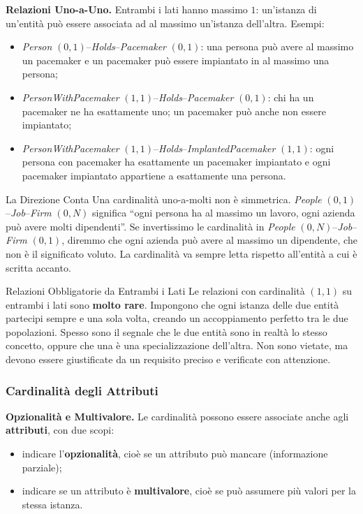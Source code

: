 \documentclass[12pt]{extarticle}
\begin{document}
\medskip
\noindent \textbf{Relazioni Uno-a-Uno.} Entrambi i lati hanno massimo $1$: un'istanza di un'entità può essere associata ad al massimo un'istanza dell'altra. Esempi:
\begin{itemize}
    \item \textit{Person} $(0,1)$--\textit{Holds}--\textit{Pacemaker} $(0,1)$: una persona può avere al massimo un pacemaker e un pacemaker può essere impiantato in al massimo una persona;
    \item \textit{PersonWithPacemaker} $(1,1)$--\textit{Holds}--\textit{Pacemaker} $(0,1)$: chi ha un pacemaker ne ha esattamente uno; un pacemaker può anche non essere impiantato;
    \item \textit{PersonWithPacemaker} $(1,1)$--\textit{Holds}--\textit{ImplantedPacemaker} $(1,1)$: ogni persona con pacemaker ha esattamente un pacemaker impiantato e ogni pacemaker impiantato appartiene a esattamente una persona.
\end{itemize}

\begin{cbox}{La Direzione Conta}
\noindent Una cardinalità uno-a-molti non è simmetrica. \textit{People} $(0,1)$--\textit{Job}--\textit{Firm} $(0,N)$ significa ``ogni persona ha al massimo un lavoro, ogni azienda può avere molti dipendenti''. Se invertissimo le cardinalità in \textit{People} $(0,N)$--\textit{Job}--\textit{Firm} $(0,1)$, diremmo che ogni azienda può avere al massimo un dipendente, che non è il significato voluto. La cardinalità va sempre letta rispetto all'entità a cui è scritta accanto.
\end{cbox}

\begin{cbox}{Relazioni Obbligatorie da Entrambi i Lati}
\noindent Le relazioni con cardinalità $(1,1)$ su entrambi i lati sono \textbf{molto rare}. Impongono che ogni istanza delle due entità partecipi sempre e una sola volta, creando un accoppiamento perfetto tra le due popolazioni. Spesso sono il segnale che le due entità sono in realtà lo stesso concetto, oppure che una è una specializzazione dell'altra. Non sono vietate, ma devono essere giustificate da un requisito preciso e verificate con attenzione.
\end{cbox}

\subsubsection{Cardinalità degli Attributi}

\noindent \textbf{Opzionalità e Multivalore.} Le cardinalità possono essere associate anche agli \textbf{attributi}, con due scopi:
\begin{itemize}
    \item indicare l'\textbf{opzionalità}, cioè se un attributo può mancare (informazione parziale);
    \item indicare se un attributo è \textbf{multivalore}, cioè se può assumere più valori per la stessa istanza.
\end{itemize}
\end{document}
